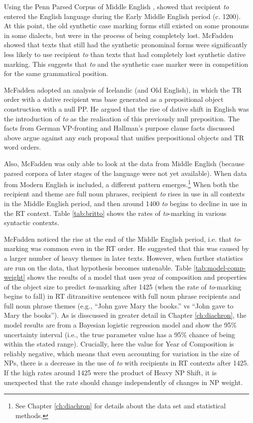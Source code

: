 		Using the Penn Parsed Corpus of Middle English \citep{Kroch.2000}, \cite{McFadden.2002} showed that recipient \textit{to} entered the English language during the Early Middle English period (c. 1200). At this point, the old synthetic case marking forms still existed on some pronouns in some dialects, but were in the process of being completely lost. McFadden showed that texts that still had the synthetic pronominal forms were significantly less likely to use recipient \textit{to} than texts that had completely lost synthetic dative marking. This suggests that \textit{to} and the synthetic case marker were in competition for the same grammatical position.

		McFadden adopted an analysis of Icelandic (and Old English), in which the TR order with a dative recipient was base generated as a prepositional object construction with a null PP. He argued that the rise of dative shift in English was the introduction of \textit{to} as the realisation of this previously null preposition. The facts from German VP-fronting and Hallman's purpose clause facts discussed above argue against any such proposal that unifies prepositional objects and TR word orders.

		Also, McFadden was only able to look at the data from Middle English (because parsed corpora of later stages of the language were not yet available). When data from Modern English \citep{Kroch.2004,Kroch.2010,Taylor.2006} is included, a different pattern emerges.\footnote{See Chapter \ref{ch:diachron} for details about the data set and statistical methods.} When both the recipient and theme are full noun phrases, recipient \textit{to} rises in use in all contexts in the Middle English period, and then around 1400 \textit{to} begins to decline in use in the RT context. Table \ref{tab:britto} shows the rates of \textit{to}-marking in various syntactic contexts.



McFadden noticed the rise at the end of the Middle English period, i.e. that \textit{to}-marking was common even in the RT order. He suggested that this was caused by a larger number of heavy themes in later texts. However, when further statistics are run on the data, that hypothesis becomes untenable. Table \ref{tab:model-comp-weight} shows the results of a model that uses year of composition and properties of the object size to predict \textit{to}-marking after 1425 (when the rate of \textit{to}-marking begins to fall) in RT ditransitive sentences with full noun phrase recipients and full noun phrase themes (e.g., ``John gave Mary the books.'' vs ``John gave to Mary the books''). As is disscussed in greater detail in Chapter \ref{ch:diachron}, the model results are from a Bayesian logistic regression model and show the 95\% uncertainty interval (i.e., the true parameter value has a 95\% chance of being within the stated range). Crucially, here the value for Year of Composition is reliably negative, which means that even accounting for variation in the size of NPs, there is a decrease in the use of \textit{to} with recipients in RT contexts after 1425. If the high rates around 1425 were the product of Heavy NP Shift, it is unexpected that the rate should change independently of changes in NP weight.


